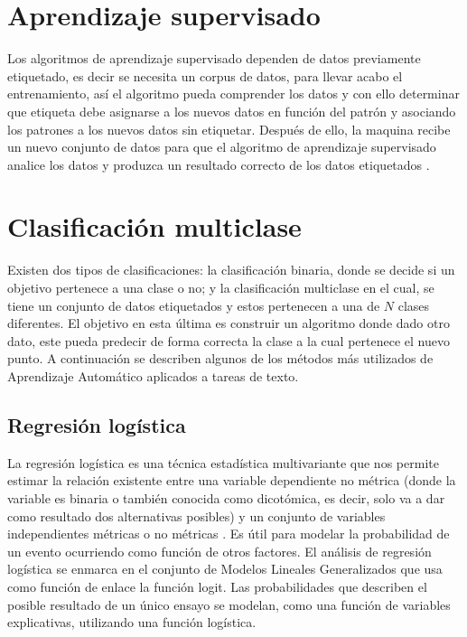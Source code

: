 
\section{Aprendizaje supervisado}

Los algoritmos de aprendizaje supervisado dependen de datos previamente etiquetado, es decir se necesita un corpus de datos, para llevar acabo el entrenamiento, así 
el algoritmo pueda comprender los datos y con ello determinar que etiqueta debe asignarse a los nuevos datos 
en función del patrón y asociando los patrones a los nuevos datos sin etiquetar. Después de ello, la maquina recibe 
un nuevo conjunto de datos para que el algoritmo de aprendizaje supervisado analice los datos y produzca un resultado 
correcto de los datos etiquetados \citep{CT4}.\\


\section{Clasificación multiclase}

Existen dos tipos de clasificaciones: la clasificación binaria, donde se decide si un objetivo pertenece a una clase o no; y la clasificación multiclase en el cual, se tiene un conjunto de datos etiquetados y estos pertenecen a una de $N$ clases diferentes. El objetivo en esta última es construir un algoritmo donde dado otro dato, este pueda predecir de forma correcta la clase a la cual pertenece el nuevo punto. A continuación se describen algunos de los métodos más utilizados de Aprendizaje Automático aplicados a tareas de texto.


\subsection{Regresión logística}

La regresión logística es una técnica estadística multivariante que nos permite estimar la relación existente entre una variable dependiente 
no métrica (donde la variable es binaria o también conocida como dicotómica, es decir, solo va a dar como resultado dos alternativas posibles) 
y un conjunto de variables independientes métricas o no métricas \citep{CT6}. Es útil para modelar la probabilidad de un evento ocurriendo como 
función de otros factores. El análisis de regresión logística se enmarca en el conjunto de Modelos Lineales Generalizados que usa como función de 
enlace la función logit. Las probabilidades que describen el posible resultado de un único ensayo se modelan, como una función de variables explicativas, 
utilizando una función logística.\\

